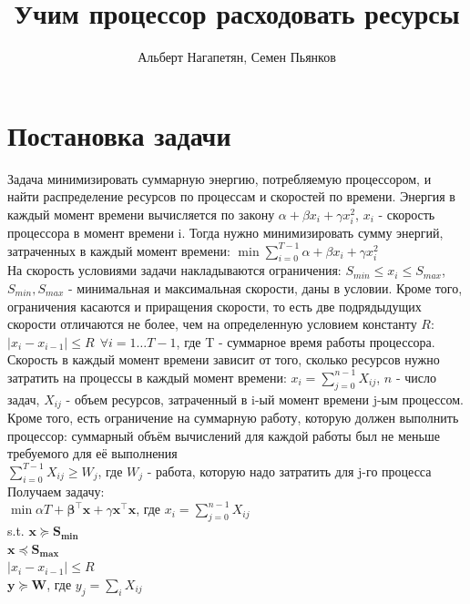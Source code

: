 \documentclass{article}
\title{Учим процессор расходовать ресурсы}
\author{Альберт Нагапетян, Семен Пьянков}
\date{}
\begin{document}
\maketitle

\section{Постановка задачи}

Задача минимизировать суммарную энергию, потребляемую процессором, и найти распределение ресурсов по процессам и скоростей по времени. 
Энергия в каждый момент времени вычисляется по закону $ \alpha + \beta x_i + \gamma x_i^2$, $x_i$ - скорость процессора в момент времени i. Тогда нужно минимизировать сумму энергий, затраченных в каждый момент времени: $\min \sum \limits_{i=0}^{T-1} \alpha + \beta x_i + \gamma x_i^2$\\

На скорость условиями задачи накладываются ограничения: $S_{min} \le x_i \le S_{max}$, $S_{min}, S_{max}$ - минимальная и максимальная скорости, даны в условии. Кроме того, ограничения касаются и приращения скорости, то есть две подрядыдущих скорости отличаются не более, чем на определенную условием константу $R$: $|x_i-x_{i-1}| \le R ~~ \forall i = 1 \dots T-1$, где T - суммарное время работы процессора. \\

Скорость в каждый момент времени зависит от того, сколько ресурсов нужно затратить на процессы в каждый момент времени:
$x_i = \sum \limits_{j=0}^{n-1} X_{ij}$, $n$ - число задач, $X_{ij}$ - объем ресурсов, затраченный в i-ый момент времени j-ым процессом.\\

Кроме того, есть ограничение на суммарную работу, которую должен выполнить процессор: суммарный объём вычислений для каждой работы был не меньше требуемого для её выполнения\\
$\sum \limits_{i=0}^{T-1} X_{ij} \ge W_j$, где $W_j$ - работа, которую надо затратить для j-го процесса\\


Получаем задачу:\\
$\min \alpha T + \mathbf{\beta^{\top}x} + \gamma \mathbf{x^{\top}x}$, где $x_i = \sum \limits_{j=0}^{n-1} X_{ij}$\\
s.t. $\mathbf{x} \succeq \mathbf{S_{min}} $\\
$\mathbf{x} \preceq \mathbf{S_{max}}$\\
$|x_{i} - x_{i-1}| \le R$\\
$\mathbf{y} \succeq \mathbf{W}$, где $y_j = \sum\limits_i X_{ij}$\\
\end{document}
